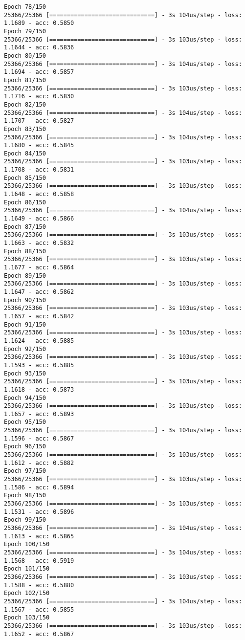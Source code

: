 \documentclass[11pt]{article}
\begin{document}
\begin{Verbatim}[commandchars=\\\{\}]
Epoch 78/150
25366/25366 [==============================] - 3s 104us/step - loss: 1.1689 - acc: 0.5850
Epoch 79/150
25366/25366 [==============================] - 3s 103us/step - loss: 1.1644 - acc: 0.5836
Epoch 80/150
25366/25366 [==============================] - 3s 104us/step - loss: 1.1694 - acc: 0.5857
Epoch 81/150
25366/25366 [==============================] - 3s 103us/step - loss: 1.1716 - acc: 0.5830
Epoch 82/150
25366/25366 [==============================] - 3s 104us/step - loss: 1.1707 - acc: 0.5827
Epoch 83/150
25366/25366 [==============================] - 3s 104us/step - loss: 1.1680 - acc: 0.5845
Epoch 84/150
25366/25366 [==============================] - 3s 103us/step - loss: 1.1708 - acc: 0.5831
Epoch 85/150
25366/25366 [==============================] - 3s 103us/step - loss: 1.1648 - acc: 0.5858
Epoch 86/150
25366/25366 [==============================] - 3s 104us/step - loss: 1.1649 - acc: 0.5866
Epoch 87/150
25366/25366 [==============================] - 3s 103us/step - loss: 1.1663 - acc: 0.5832
Epoch 88/150
25366/25366 [==============================] - 3s 103us/step - loss: 1.1677 - acc: 0.5864
Epoch 89/150
25366/25366 [==============================] - 3s 103us/step - loss: 1.1647 - acc: 0.5862
Epoch 90/150
25366/25366 [==============================] - 3s 103us/step - loss: 1.1657 - acc: 0.5842
Epoch 91/150
25366/25366 [==============================] - 3s 103us/step - loss: 1.1624 - acc: 0.5885
Epoch 92/150
25366/25366 [==============================] - 3s 103us/step - loss: 1.1593 - acc: 0.5885
Epoch 93/150
25366/25366 [==============================] - 3s 103us/step - loss: 1.1618 - acc: 0.5873
Epoch 94/150
25366/25366 [==============================] - 3s 103us/step - loss: 1.1657 - acc: 0.5893
Epoch 95/150
25366/25366 [==============================] - 3s 104us/step - loss: 1.1596 - acc: 0.5867
Epoch 96/150
25366/25366 [==============================] - 3s 103us/step - loss: 1.1612 - acc: 0.5882
Epoch 97/150
25366/25366 [==============================] - 3s 103us/step - loss: 1.1586 - acc: 0.5894
Epoch 98/150
25366/25366 [==============================] - 3s 103us/step - loss: 1.1531 - acc: 0.5896
Epoch 99/150
25366/25366 [==============================] - 3s 104us/step - loss: 1.1613 - acc: 0.5865
Epoch 100/150
25366/25366 [==============================] - 3s 104us/step - loss: 1.1568 - acc: 0.5919
Epoch 101/150
25366/25366 [==============================] - 3s 103us/step - loss: 1.1588 - acc: 0.5880
Epoch 102/150
25366/25366 [==============================] - 3s 104us/step - loss: 1.1567 - acc: 0.5855
Epoch 103/150
25366/25366 [==============================] - 3s 103us/step - loss: 1.1652 - acc: 0.5867

\end{Verbatim}
\end{document}

